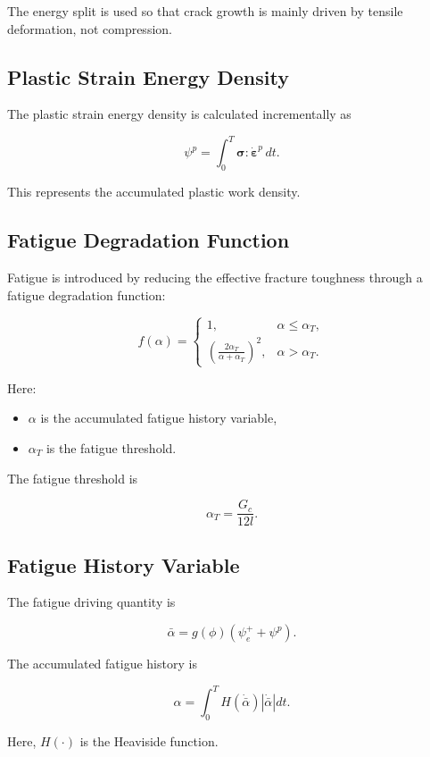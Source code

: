 ﻿\documentclass[11pt,a4paper]{article}
\begin{document}
The energy split is used so that crack growth is mainly driven by tensile deformation, not compression.

\subsection{Plastic Strain Energy Density}

The plastic strain energy density is calculated incrementally as

\[
\psi^p
=
\int_0^T
\bm{\sigma}:\dot{\bm{\varepsilon}}^p\,dt.
\]

This represents the accumulated plastic work density.

\subsection{Fatigue Degradation Function}

Fatigue is introduced by reducing the effective fracture toughness through a fatigue degradation function:

\[
f(\alpha)
=
\begin{cases}
1, & \alpha \leq \alpha_T, \\
\left(
\frac{2\alpha_T}{\alpha+\alpha_T}
\right)^2,
& \alpha > \alpha_T.
\end{cases}
\]

Here:

\begin{itemize}[leftmargin=*]
    \item $\alpha$ is the accumulated fatigue history variable,
    \item $\alpha_T$ is the fatigue threshold.
\end{itemize}

The fatigue threshold is

\[
\alpha_T
=
\frac{G_c}{12l}.
\]

\subsection{Fatigue History Variable}

The fatigue driving quantity is

\[
\bar{\alpha}
=
g(\phi)
\left(
\psi_e^+ + \psi^p
\right).
\]

The accumulated fatigue history is

\[
\alpha
=
\int_0^T
H(\dot{\bar{\alpha}})
|\dot{\bar{\alpha}}|dt.
\]

Here, $H(\cdot)$ is the Heaviside function.
\end{document}

